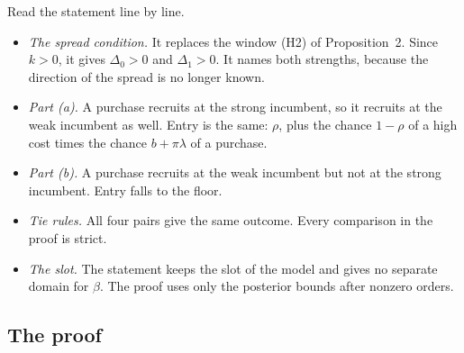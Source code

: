 Read the statement line by line.
\begin{itemize}
\item \emph{The spread condition.} It replaces the window (H2) of Proposition~2. Since \(k>0\), it gives \(\Delta_0>0\)
and \(\Delta_1>0\). It names both strengths, because the direction of the spread is no longer known.
\item \emph{Part (a).} A purchase recruits at the strong incumbent, so it recruits at the weak incumbent as well. Entry
is the same: \(\rho\), plus the chance \(1-\rho\) of a high cost times the chance \(b+\pi\lambda\) of a purchase.
\item \emph{Part (b).} A purchase recruits at the weak incumbent but not at the strong incumbent. Entry falls to the
floor.
\item \emph{Tie rules.} All four pairs give the same outcome. Every comparison in the proof is strict.
\item \emph{The slot.} The statement keeps the slot of the model and gives no separate domain for \(\beta\). The proof
uses only the posterior bounds after nonzero orders.
\end{itemize}

\subsection{The proof}\label{sec:welfare-reserveproof}

